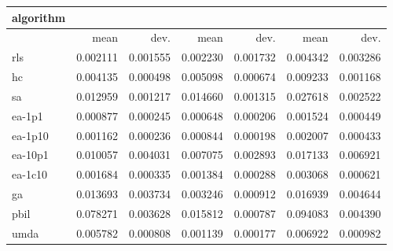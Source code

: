 \begin{tabular}{@{}l*{6}{>{{}}N{1}{2}}@{}}
\toprule
{algorithm} &  &  &  \\
\midrule
& {mean} & {dev.} & {mean} & {dev.} & {mean} & {dev.} \\
\midrule
rls & 0.002111 & 0.001555 & 0.002230 & 0.001732 & 0.004342 & 0.003286 \\
 hc & 0.004135 & 0.000498 & 0.005098 & 0.000674 & 0.009233 & 0.001168 \\
 sa & 0.012959 & 0.001217 & 0.014660 & 0.001315 & 0.027618 & 0.002522 \\
 ea-1p1 & 0.000877 & 0.000245 & 0.000648 & 0.000206 & 0.001524 & 0.000449 \\
 ea-1p10 & 0.001162 & 0.000236 & 0.000844 & 0.000198 & 0.002007 & 0.000433 \\
 ea-10p1 & 0.010057 & 0.004031 & 0.007075 & 0.002893 & 0.017133 & 0.006921 \\
 ea-1c10 & 0.001684 & 0.000335 & 0.001384 & 0.000288 & 0.003068 & 0.000621 \\
 ga & 0.013693 & 0.003734 & 0.003246 & 0.000912 & 0.016939 & 0.004644 \\
 pbil & 0.078271 & 0.003628 & 0.015812 & 0.000787 & 0.094083 & 0.004390 \\
 umda & 0.005782 & 0.000808 & 0.001139 & 0.000177 & 0.006922 & 0.000982 \\
 \bottomrule
\end{tabular}
